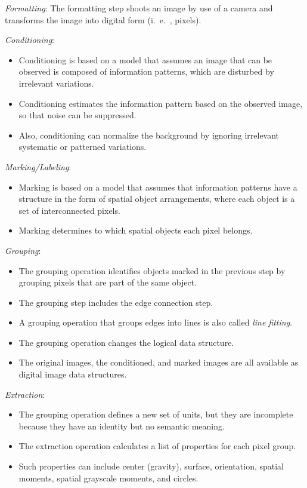 \begin{steps}
\item \textit{Formatting}: The formatting step shoots an image by use of a camera and transforms the image into digital form (i.\ e.\ , pixels).
\item \textit{Conditioning}: 
		\begin{itemize}
			\item Conditioning is based on a model that assumes an image that can be observed is composed of information patterns, which are disturbed by irrelevant variations. \item Conditioning estimates the information pattern based on the observed image, so that noise can be suppressed. 
			\item Also, conditioning can normalize the background by ignoring irrelevant systematic or patterned variations. 
		\end{itemize}
		
\item \textit{Marking/Labeling}: 
		\begin{itemize}
			\item Marking is based on a model that assumes that information patterns have a structure in the form of spatial object arrangements, where each object is a set of interconnected pixels. 
			\item Marking determines to which spatial objects each pixel belongs.
		\end{itemize}
\item \textit{Grouping}: 
		\begin{itemize}
			\item The grouping operation identifies objects marked in the previous step by grouping pixels that are part of the same object.
			\item The grouping step includes the edge connection step. 
			\item A grouping operation that groups edges into lines is also called \textit{line fitting}.
			\item The grouping operation changes the logical data structure. 
			\item The original images, the conditioned, and marked images are all available as digital image data structures. 
		\end{itemize}
\item \textit{Extraction}: 	
			\begin{itemize}
				\item The grouping operation defines a new set of units, but they are incomplete because they have an identity but no semantic meaning. 
				\item The extraction operation calculates a list of properties for each pixel group. 
				\item Such properties can include center (gravity), surface, orientation, spatial moments, spatial grayscale moments, and circles.
			\end{itemize}
		

\end{steps}
